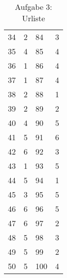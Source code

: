 \documentclass[12pt,a4paper]{article}
\begin{document}
\begin{table}[h]
\begin{tabular}[h]{|*{2}{B|c|}}
            34 & 2 & 84 & 3 \\
            35 & 4 & 85 & 4 \\
            36 & 1 & 86 & 4 \\
            37 & 1 & 87 & 4 \\
            38 & 2 & 88 & 1 \\
            39 & 2 & 89 & 2 \\
            40 & 4 & 90 & 5 \\
            41 & 5 & 91 & 6 \\
            42 & 6 & 92 & 3 \\
            43 & 1 & 93 & 5 \\
            44 & 5 & 94 & 1 \\
            45 & 3 & 95 & 5 \\
            46 & 6 & 96 & 5 \\
            47 & 6 & 97 & 2 \\
            48 & 5 & 98 & 3 \\
            49 & 5 & 99 & 2 \\
            50 & 5 & 100 & 4 \\
            \hline
        \end{tabular}
        \caption{Aufgabe 3: Urliste}
        \label{tab:urliste}
    \end{table}
\end{document}

